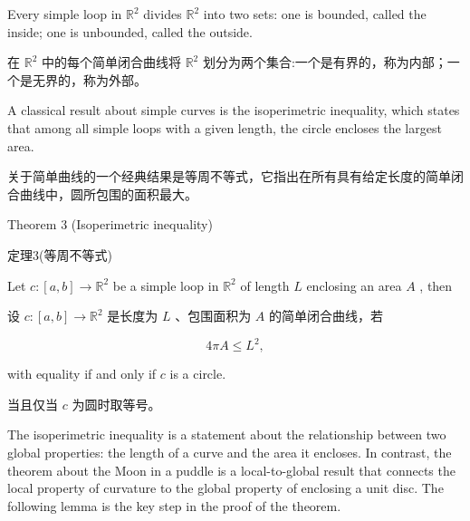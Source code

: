 \HRule

Every simple loop in \({\mathbb{R}}^{2}\) divides \({\mathbb{R}}^{2}\) into two sets: one is bounded, called the inside; one is unbounded, called the outside.

\begin{tcolorbox}
在 \({\mathbb{R}}^{2}\) 中的每个简单闭合曲线将 \({\mathbb{R}}^{2}\) 划分为两个集合:一个是有界的，称为内部；一个是无界的，称为外部。
\end{tcolorbox}

A classical result about simple curves is the isoperimetric inequality, which states that among all simple loops with a given length, the circle encloses the largest area.

\begin{tcolorbox}
关于简单曲线的一个经典结果是等周不等式，它指出在所有具有给定长度的简单闭合曲线中，圆所包围的面积最大。
\end{tcolorbox}

\HRule

Theorem 3 (Isoperimetric inequality)

\begin{tcolorbox}
定理3(等周不等式)
\end{tcolorbox}

\HRule

Let \(c : \left\lbrack  {a,b}\right\rbrack   \rightarrow  {\mathbb{R}}^{2}\) be a simple loop in \({\mathbb{R}}^{2}\) of length \(L\) enclosing an area \(A\) , then

\begin{tcolorbox}
设 \(c : \left\lbrack  {a,b}\right\rbrack   \rightarrow  {\mathbb{R}}^{2}\) 是长度为 \(L\) 、包围面积为 \(A\) 的简单闭合曲线，若
\end{tcolorbox}

\[
{4\pi A} \leq  {L}^{2},
\]

with equality if and only if \(c\) is a circle.

\begin{tcolorbox}
当且仅当 \(c\) 为圆时取等号。
\end{tcolorbox}

The isoperimetric inequality is a statement about the relationship between two global properties: the length of a curve and the area it encloses. In contrast, the theorem about the Moon in a puddle is a local-to-global result that connects the local property of curvature to the global property of enclosing a unit disc. The following lemma is the key step in the proof of the theorem.

